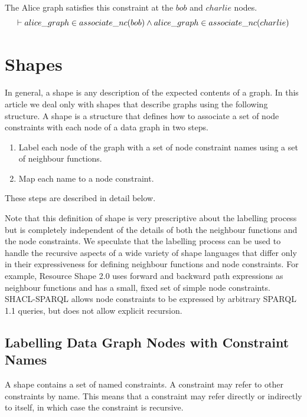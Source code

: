 \documentclass{article}
\begin{document}
The Alice graph satisfies this constraint at the $bob$ and $charlie$ nodes.
\[\vdash
	alice\_graph \in associate\_nc(bob) \land \\
	alice\_graph \in associate\_nc(charlie)
\]

\section{Shapes}
\label{sec-shapes}

In general, a shape is any description of the expected contents of a graph.
In this article we deal only with shapes that describe graphs using the following structure.
A shape is a structure that defines how to associate a set of node constraints with each node of a data graph in two steps.
\begin{enumerate}
\item Label each node of the graph with a set of node constraint names using a set of neighbour functions.
\item Map each name to a node constraint.
\end{enumerate}
These steps are described in detail below.

Note that this definition of shape is very prescriptive about the labelling process but is completely independent of the details of 
both the neighbour functions and the node constraints.
We speculate that the labelling process can be used to handle the recursive aspects of a wide variety of shape languages that differ only in their 
expressiveness for defining neighbour functions and node constraints.
For example, Resource Shape 2.0 uses forward and backward path expressions as neighbour functions and has a small, fixed set of simple node constraints. 
SHACL-SPARQL allows node constraints to be expressed by arbitrary SPARQL 1.1 queries, but does not
allow explicit recursion.

\subsection{Labelling Data Graph Nodes with Constraint Names}
\cbstart
A shape contains a set of named constraints.
A constraint may refer to other constraints by name.
This means that a constraint may refer directly or indirectly to itself, in which case the constraint is recursive.
\cbend
\end{document}
